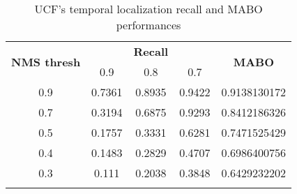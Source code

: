 \begin{center}
  \begin{longtable}{|| c || c c c | c |}
    \hline
    \multirow{2}{*}{\textbf{NMS thresh}} & {} & {\textbf{Recall}} & {} & \multirow{2}{*}{\textbf{MABO}} \\
      {} & 0.9 & 0.8 & 0.7 & {} \\
      \hline
      0.9 & 0.7361 & 0.8935 & 0.9422 & 0.9138130172 \\
      \hline
      0.7 & 0.3194 & 0.6875 & 0.9293 & 0.8412186326 \\
      \hline
      0.5 & 0.1757 & 0.3331 & 0.6281 & 0.7471525429 \\
      \hline
      0.4 &0.1483 & 0.2829 & 0.4707 & 0.6986400756 \\
      \hline
      0.3 & 0.111 & 0.2038 & 0.3848 & 0.6429232202 \\
      \hline
    \caption{UCF's temporal localization recall and MABO performances}
    \label{table:temp_cls_recall_1}
  \end{longtable}
\end{center}

